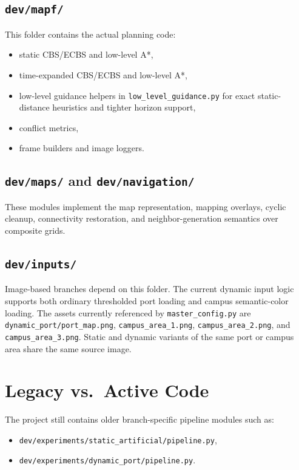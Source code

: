 \documentclass[11pt]{article}
\begin{document}
\subsection{\texttt{dev/mapf/}}

This folder contains the actual planning code:
\begin{itemize}[leftmargin=2em]
    \item static CBS/ECBS and low-level A*,
    \item time-expanded CBS/ECBS and low-level A*,
    \item low-level guidance helpers in \texttt{low\_level\_guidance.py} for exact static-distance heuristics and tighter horizon support,
    \item conflict metrics,
    \item frame builders and image loggers.
\end{itemize}

\subsection{\texttt{dev/maps/} and \texttt{dev/navigation/}}

These modules implement the map representation, mapping overlays, cyclic cleanup, connectivity restoration, and neighbor-generation semantics over composite grids.

\subsection{\texttt{dev/inputs/}}

Image-based branches depend on this folder. The current dynamic input logic supports both ordinary thresholded port loading and campus semantic-color loading. The assets currently referenced by \texttt{master\_config.py} are \texttt{dynamic\_port/port\_map.png}, \texttt{campus\_area\_1.png}, \texttt{campus\_area\_2.png}, and \texttt{campus\_area\_3.png}. Static and dynamic variants of the same port or campus area share the same source image.

\section{Legacy vs.\ Active Code}

The project still contains older branch-specific pipeline modules such as:
\begin{itemize}[leftmargin=2em]
    \item \texttt{dev/experiments/static\_artificial/pipeline.py},
    \item \texttt{dev/experiments/dynamic\_port/pipeline.py}.
\end{itemize}
\end{document}
